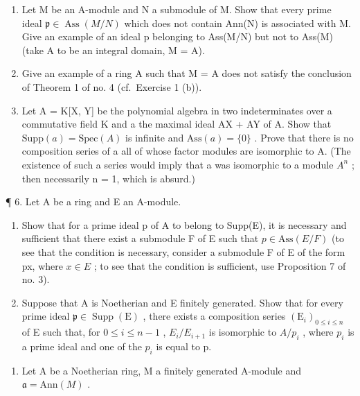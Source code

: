 \begin{enumerate}
\def\labelenumi{\arabic{enumi}.}
\setcounter{enumi}{2}
\item
  Let M be an A-module and N a submodule of M. Show that every prime ideal \(\mathfrak{p} \in \operatorname{Ass}(M/N)\) which does not contain Ann(N) is associated with M. Give an example of an ideal p belonging to Ass(M/N) but not to Ass(M) (take A to be an integral domain, M = A).
\item
  Give an example of a ring A such that M = A does not satisfy the conclusion of Theorem 1 of no. 4 (cf.~Exercise 1 (b)).
\item
  Let A = K{[}X, Y{]} be the polynomial algebra in two indeterminates over a commutative field K and a the maximal ideal AX + AY of A. Show that \(\text{Supp}(a) = \text{Spec}(A)\) is infinite and \(\text{Ass}(a) = \{0\}\) . Prove that there is no composition series of a all of whose factor modules are isomorphic to A. (The existence of such a series would imply that a was isomorphic to a module \(A^{n}\) ; then necessarily n = 1, which is absurd.)
\end{enumerate}

¶ 6. Let A be a ring and E an A-module.

\begin{enumerate}
\def\labelenumi{(\alph{enumi})}
\item
  Show that for a prime ideal p of A to belong to Supp(E), it is necessary and sufficient that there exist a submodule F of E such that \(p \in \text{Ass}(E/F)\) (to see that the condition is necessary, consider a submodule F of E of the form px, where \(x \in E\) ; to see that the condition is sufficient, use Proposition 7 of no. 3).
\item
  Suppose that A is Noetherian and E finitely generated. Show that for every prime ideal \(\mathfrak{p}\in\operatorname{Supp}(\mathrm{E})\) , there exists a composition series \((\mathrm{E}_{i})_{0\leqslant i\leqslant n}\) of E such that, for \(0\leqslant i\leqslant n-1\) , \(E_{i}/E_{i+1}\) is isomorphic to \(A/p_{i}\) , where \(p_{i}\) is a prime ideal and one of the \(p_{i}\) is equal to p.
\end{enumerate}

\begin{enumerate}
\def\labelenumi{\arabic{enumi}.}
\setcounter{enumi}{6}
\tightlist
\item
  Let A be a Noetherian ring, M a finitely generated A-module and \(\mathfrak{a} = \text{Ann}(M)\) .
\end{enumerate}

